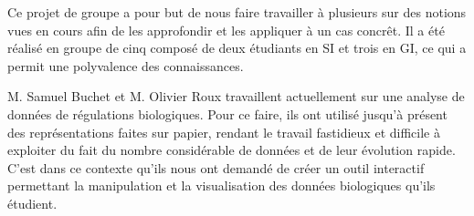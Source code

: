 Ce projet de groupe a pour but de nous faire travailler à plusieurs sur des notions vues en cours afin de les approfondir et les appliquer à un cas concrêt. Il a  été réalisé en groupe de cinq composé de deux étudiants en SI et trois en GI, ce qui a permit une polyvalence des connaissances. 
\newline 

M. Samuel Buchet et M. Olivier Roux travaillent actuellement sur une analyse de données de régulations biologiques. Pour ce faire, ils ont utilisé jusqu'à présent des représentations faites sur papier, rendant le travail fastidieux et difficile à exploiter du fait du nombre considérable de données et de leur évolution rapide. C'est dans ce contexte qu'ils nous ont demandé de créer un outil interactif permettant la manipulation et la visualisation des données biologiques qu'ils étudient. 
